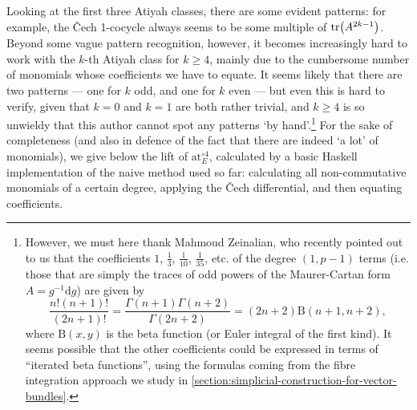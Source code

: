 \documentclass[11pt,fleqn]{article}
\theoremstyle{plain}
\theoremstyle{definition}
\theoremstyle{remark}
\numberwithin{equation}{theorem}
\newcommand{\at}{\mathrm{at}}
\newcommand{\expat}[1]{\at^{\circ#1}}
\begin{document}
        Looking at the first three Atiyah classes, there are some evident patterns: for example, the Čech 1-cocycle always seems to be some multiple of $\tr(A^{2k-1})$.
        Beyond some vague pattern recognition, however, it becomes increasingly hard to work with the $k$-th Atiyah class for $k\geqslant4$, mainly due to the cumbersome number of monomials whose coefficients we have to equate.
        It seems likely that there are two patterns --- one for $k$ odd, and one for $k$ even --- but even this is hard to verify, given that $k=0$ and $k=1$ are both rather trivial, and $k\geqslant4$ is so unwieldy that this author cannot spot any patterns `by hand'.\footnote{However, we must here thank Mahmoud Zeinalian, who recently pointed out to us that the coefficients $1$, $\frac13$, $\frac{1}{10}$, $\frac{1}{35}$, etc. of the degree $(1,p-1)$ terms (i.e. those that are simply the traces of odd powers of the Maurer-Cartan form $A = g^{-1}\mathrm{d}g$) are given by \[\frac{n!(n+1)!}{(2n+1)!} = \frac{\Gamma(n+1)\Gamma(n+2)}{\Gamma(2n+2)} = (2n+2)\mathrm{B}(n+1,n+2),\] where $\mathrm{B}(x,y)$ is the beta function (or Euler integral of the first kind). It seems possible that the other coefficients could be expressed in terms of ``iterated beta functions'', using the formulas coming from the fibre integration approach we study in \cref{section:simplicial-construction-for-vector-bundles}.}
        For the sake of completeness (and also in defence of the fact that there are indeed `a lot' of monomials), we give below the lift of $\expat{4}_E$, calculated by a basic Haskell implementation of the naive method used so far: calculating all non-commutative monomials of a certain degree, applying the Čech differential, and then equating coefficients.
\end{document}
